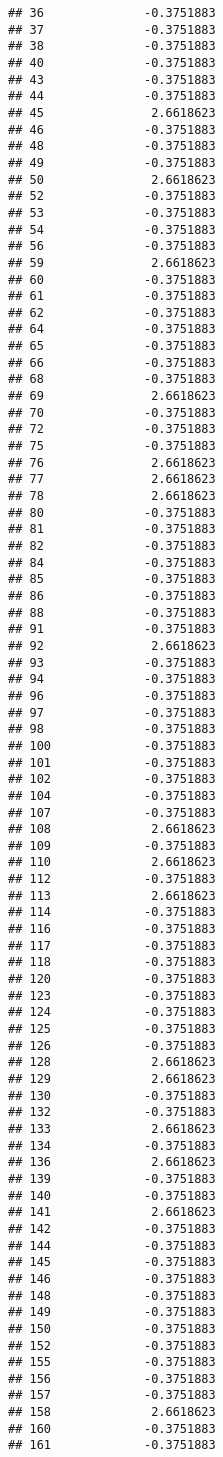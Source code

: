 \documentclass[
]{article}
\begin{document}
\begin{verbatim}
## 36              -0.3751883
## 37              -0.3751883
## 38              -0.3751883
## 40              -0.3751883
## 43              -0.3751883
## 44              -0.3751883
## 45               2.6618623
## 46              -0.3751883
## 48              -0.3751883
## 49              -0.3751883
## 50               2.6618623
## 52              -0.3751883
## 53              -0.3751883
## 54              -0.3751883
## 56              -0.3751883
## 59               2.6618623
## 60              -0.3751883
## 61              -0.3751883
## 62              -0.3751883
## 64              -0.3751883
## 65              -0.3751883
## 66              -0.3751883
## 68              -0.3751883
## 69               2.6618623
## 70              -0.3751883
## 72              -0.3751883
## 75              -0.3751883
## 76               2.6618623
## 77               2.6618623
## 78               2.6618623
## 80              -0.3751883
## 81              -0.3751883
## 82              -0.3751883
## 84              -0.3751883
## 85              -0.3751883
## 86              -0.3751883
## 88              -0.3751883
## 91              -0.3751883
## 92               2.6618623
## 93              -0.3751883
## 94              -0.3751883
## 96              -0.3751883
## 97              -0.3751883
## 98              -0.3751883
## 100             -0.3751883
## 101             -0.3751883
## 102             -0.3751883
## 104             -0.3751883
## 107             -0.3751883
## 108              2.6618623
## 109             -0.3751883
## 110              2.6618623
## 112             -0.3751883
## 113              2.6618623
## 114             -0.3751883
## 116             -0.3751883
## 117             -0.3751883
## 118             -0.3751883
## 120             -0.3751883
## 123             -0.3751883
## 124             -0.3751883
## 125             -0.3751883
## 126             -0.3751883
## 128              2.6618623
## 129              2.6618623
## 130             -0.3751883
## 132             -0.3751883
## 133              2.6618623
## 134             -0.3751883
## 136              2.6618623
## 139             -0.3751883
## 140             -0.3751883
## 141              2.6618623
## 142             -0.3751883
## 144             -0.3751883
## 145             -0.3751883
## 146             -0.3751883
## 148             -0.3751883
## 149             -0.3751883
## 150             -0.3751883
## 152             -0.3751883
## 155             -0.3751883
## 156             -0.3751883
## 157             -0.3751883
## 158              2.6618623
## 160             -0.3751883
## 161             -0.3751883

\end{verbatim}
\end{document}
